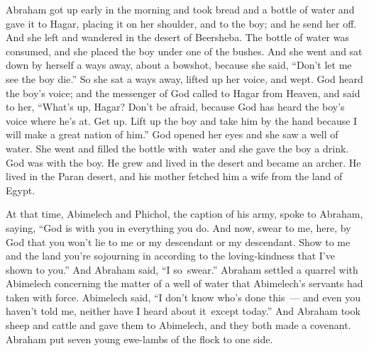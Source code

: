 \begin{inparaenum}
     Abraham got up early in the morning and took bread and a bottle of water and gave it to Hagar, placing it on her shoulder, and to the boy; and he send her off. And she left and wandered in the desert of Beersheba.%
     The bottle of water was consumed, and she placed the boy under one of the bushes.%
     And she went and sat down by herself a ways away, about a bowshot, because she said, ``Don't let me see the boy die.'' So she sat a ways away, lifted up her voice, and wept.%
     God heard the boy's voice; and the messenger of God called to Hagar from Heaven, and said to her, ``What's up, Hagar? Don't be afraid, because God has heard the boy's voice where he's at.%
     Get up. Lift up the boy and take him by the hand because I will make a great nation of him.''%
     God opened her eyes and she saw a well of water. She went and filled the bottle with\understood\ water and she gave the boy a drink.%
     God was with the boy. He grew and lived in the desert and became an archer.%
     He lived in the Paran desert, and his mother fetched him a wife from the land of Egypt.%
    
     At that time, Abimelech and Phichol, the caption of his army, spoke to Abraham, saying, ``God is with you in everything you do.%
     And now, swear to me, here, by God that you won't lie to me or my descendant or my descendant. Show to me and the land you're sojourning in according to the loving-kindness that I've shown to you.''%
     And Abraham said, ``I so\understood\ swear.''%
     Abraham settled a quarrel with Abimelech concerning the matter of a well of water that Abimelech's servants had taken with force.%
     Abimelech said, ``I don't know who's done this~--- and even you haven't told me, neither have I heard {about it}\understood\ except today.''%
     And Abraham took sheep and cattle and gave them to Abimelech, and they both made a covenant.%
     Abraham put seven young ewe-lambs of the flock to one side.%
\end{inparaenum}
